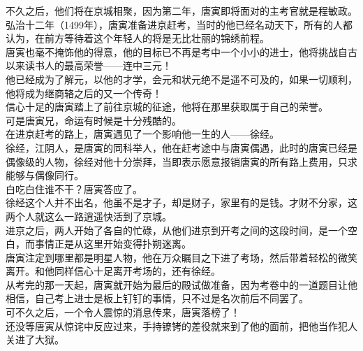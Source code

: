 \begin{multicols}{\theparacolNo}
不久之后，他们将在京城相聚，因为第二年，唐寅即将面对的主考官就是程敏政。\\

弘治十二年（1499年），唐寅准备进京赶考，当时的他已经名动天下，所有的人都认为，在前方等待着这个年轻人的将是无比壮丽的锦绣前程。\\

唐寅也毫不掩饰他的得意，他的目标已不再是考中一个小小的进士，他将挑战自古以来读书人的最高荣誉——连中三元！\\

他已经成为了解元，以他的才学，会元和状元绝不是遥不可及的，如果一切顺利，他将成为继商辂之后的又一个传奇！\\

信心十足的唐寅踏上了前往京城的征途，他将在那里获取属于自己的荣誉。\\

可是唐寅兄，命运有时候是十分残酷的。\\

在进京赶考的路上，唐寅遇见了一个影响他一生的人——徐经。\\

徐经，江阴人，是唐寅的同科举人，他在赶考途中与唐寅偶遇，此时的唐寅已经是偶像级的人物，徐经对他十分崇拜，当即表示愿意报销唐寅的所有路上费用，只求能够与偶像同行。\\

白吃白住谁不干？唐寅答应了。\\

徐经这个人并不出名，他虽不是才子，却是财子，家里有的是钱。才财不分家，这两个人就这么一路逍遥快活到了京城。\\

进京之后，两人开始了各自的忙碌，从他们进京到开考之间的这段时间，是一个空白，而事情正是从这里开始变得扑朔迷离。\\

唐寅注定到哪里都是明星人物，他在万众瞩目之下进了考场，然后带着轻松的微笑离开。和他同样信心十足离开考场的，还有徐经。\\

从考完的那一天起，唐寅就开始为最后的殿试做准备，因为考卷中的一道题目让他相信，自己考上进士是板上钉钉的事情，只不过是名次前后不同罢了。\\

可不久之后，一个令人震惊的消息传来，唐寅落榜了！\\

还没等唐寅从惊诧中反应过来，手持镣铐的差役就来到了他的面前，把他当作犯人关进了大狱。\\


\end{multicols}
